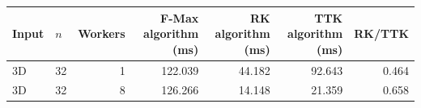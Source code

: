 \begin{tabular}{llrrrrr}
\hline
Input & $n$ & Workers & F-Max algorithm (ms) & RK algorithm (ms) & TTK algorithm (ms) & RK/TTK \\
\hline
3D & 32 & 1 & 122.039 & 44.182 & 92.643 & 0.464 \\
3D & 32 & 8 & 126.266 & 14.148 & 21.359 & 0.658 \\
\hline
\end{tabular}
